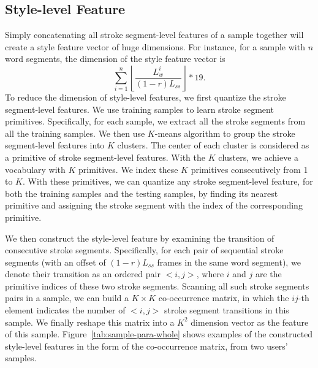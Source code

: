 \subsection{Style-level Feature}

Simply concatenating all stroke segment-level features of a sample together will create a style feature vector of huge dimensions. For instance, for a sample with $n$ word segments, the dimension of the style feature vector is
$$\sum^n_{i=1} \left \lfloor \frac{L^i_w}{(1-r)L_{ss}}\right \rfloor * 19. $$ 
%
To reduce the dimension of style-level features, we first quantize the stroke segment-level features.
We use training samples to learn stroke segment primitives. Specifically, for each sample, we extract all the stroke segments from all the training samples. %
We then use $K$-means algorithm to group the stroke segment-level features into $K$ clusters.
The center of each cluster is considered as a primitive of stroke segment-level features. With the $K$ clusters, we achieve a vocabulary with $K$ primitives.
We index these $K$ primitives consecutively from 1 to $K$. With these primitives, we can quantize any stroke segment-level feature, for both the training samples and the testing samples, by finding its nearest primitive and assigning the stroke segment with the index of the corresponding primitive.

We then construct the style-level feature by examining the transition of consecutive stroke segments.  Specifically,
for each pair of sequential stroke segments (with an offset of $(1-r)L_{ss}$ frames in the same word segment), we denote their transition
as an ordered pair $<i,j>$, where $i$ and $j$ are the primitive indices of these two stroke segments. Scanning all such stroke segments pairs
in a sample, we can build a $K\times K$ co-occurrence matrix, in which the $ij$-th element indicates the number of
$<i,j>$ stroke segment transitions in this sample. We finally reshape this matrix into a $K^2$ dimension vector as the feature of this sample.
Figure~\ref{tab:sample-para-whole} shows examples of the constructed style-level features in the form of the co-occurrence matrix, from two users' samples.  



